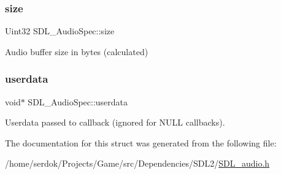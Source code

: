 \subsubsection{\texorpdfstring{size}{size}}
{\footnotesize\ttfamily Uint32 S\+D\+L\+\_\+\+Audio\+Spec\+::size}

Audio buffer size in bytes (calculated) \mbox{\label{structSDL__AudioSpec_aeec9481666f5f0982c98d3878f175d9b}} 
\subsubsection{\texorpdfstring{userdata}{userdata}}
{\footnotesize\ttfamily void$\ast$ S\+D\+L\+\_\+\+Audio\+Spec\+::userdata}

Userdata passed to callback (ignored for N\+U\+LL callbacks). 

The documentation for this struct was generated from the following file\+:\begin{DoxyCompactItemize}
\item 
/home/serdok/\+Projects/\+Game/src/\+Dependencies/\+S\+D\+L2/\hyperlink{SDL__audio_8h}{S\+D\+L\+\_\+audio.\+h}\end{DoxyCompactItemize}

